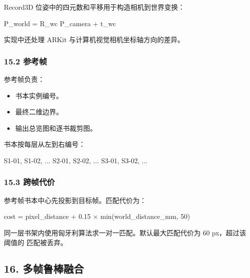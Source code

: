 \documentclass[
  chinese,
  11pt,
  a4paper,
]{article}
\newenvironment{Shaded}{\begin{snugshade}}{\end{snugshade}}
\newcommand{\NormalTok}[1]{#1}
\providecommand{\tightlist}{%
  \setlength{\itemsep}{0pt}\setlength{\parskip}{0pt}}
\begin{document}
Record3D 位姿中的四元数和平移用于构造相机到世界变换：

\begin{Shaded}
\begin{Highlighting}[]
\NormalTok{P\_world = R\_wc P\_camera + t\_wc}
\end{Highlighting}
\end{Shaded}

实现中还处理 ARKit 与计算机视觉相机坐标轴方向的差异。

\subsubsection{15.2 参考帧}\label{152-ux53c2ux8003ux5e27}

参考帧负责：

\begin{itemize}
\tightlist
\item
  书本实例编号。
\item
  最终二维边界。
\item
  输出总览图和逐书裁剪图。
\end{itemize}

书本按每层从左到右编号：

\begin{Shaded}
\begin{Highlighting}[]
\NormalTok{S1{-}01, S1{-}02, ...}
\NormalTok{S2{-}01, S2{-}02, ...}
\NormalTok{S3{-}01, S3{-}02, ...}
\end{Highlighting}
\end{Shaded}

\subsubsection{15.3 跨帧代价}\label{153-ux8de8ux5e27ux4ee3ux4ef7}

参考帧书本中心先投影到目标帧。匹配代价为：

\begin{Shaded}
\begin{Highlighting}[]
\NormalTok{cost =}
\NormalTok{  pixel\_distance}
\NormalTok{  + 0.15 × min(world\_distance\_mm, 50)}
\end{Highlighting}
\end{Shaded}

同一层书架内使用匈牙利算法求一对一匹配。默认最大匹配代价为 60
px，超过该阈值的 匹配被丢弃。

\subsection{16.
多帧鲁棒融合}\label{16-ux591aux5e27ux9c81ux68d2ux878dux5408}
\end{document}
